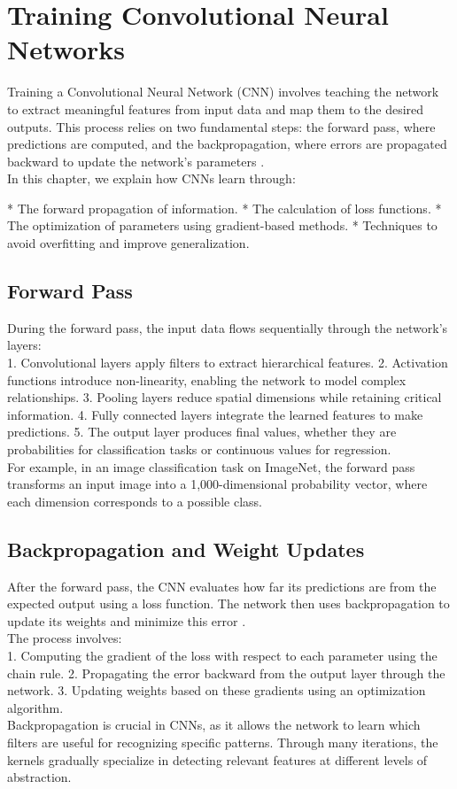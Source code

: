 \chapter{Training Convolutional Neural Networks}

Training a Convolutional Neural Network (CNN) involves teaching the network to extract meaningful features from input data and map them to the desired outputs.
This process relies on two fundamental steps: the forward pass, where predictions are computed, and the backpropagation, where errors are propagated backward to update the network’s parameters \cite{goodfellow2016deep}.
\\
In this chapter, we explain how CNNs learn through:

* The forward propagation of information.
* The calculation of loss functions.
* The optimization of parameters using gradient-based methods.
* Techniques to avoid overfitting and improve generalization.

\section{Forward Pass}

During the forward pass, the input data flows sequentially through the network’s layers:
\\
1. Convolutional layers apply filters to extract hierarchical features.
2. Activation functions introduce non-linearity, enabling the network to model complex relationships.
3. Pooling layers reduce spatial dimensions while retaining critical information.
4. Fully connected layers integrate the learned features to make predictions.
5. The output layer produces final values, whether they are probabilities for classification tasks or continuous values for regression.
\\
For example, in an image classification task on ImageNet, the forward pass transforms an input image into a 1,000-dimensional probability vector, where each dimension corresponds to a possible class.

\section{Backpropagation and Weight Updates}

After the forward pass, the CNN evaluates how far its predictions are from the expected output using a loss function.
The network then uses backpropagation to update its weights and minimize this error \cite{goodfellow2016deep}.
\\
The process involves:
\\
1. Computing the gradient of the loss with respect to each parameter using the chain rule.
2. Propagating the error backward from the output layer through the network.
3. Updating weights based on these gradients using an optimization algorithm.
\\
Backpropagation is crucial in CNNs, as it allows the network to learn which filters are useful for recognizing specific patterns.
Through many iterations, the kernels gradually specialize in detecting relevant features at different levels of abstraction.

